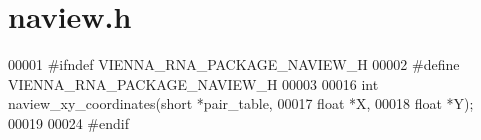 \hypertarget{naview_8h_source}{}\section{naview.\+h}
\label{naview_8h_source}

\begin{DoxyCode}
00001 \textcolor{preprocessor}{#ifndef VIENNA\_RNA\_PACKAGE\_NAVIEW\_H}
00002 \textcolor{preprocessor}{#define VIENNA\_RNA\_PACKAGE\_NAVIEW\_H}
00003 
00016 \textcolor{keywordtype}{int} naview\_xy\_coordinates(\textcolor{keywordtype}{short} *pair\_table,
00017                           \textcolor{keywordtype}{float} *X,
00018                           \textcolor{keywordtype}{float} *Y);
00019 
00024 \textcolor{preprocessor}{#endif}
\end{DoxyCode}
